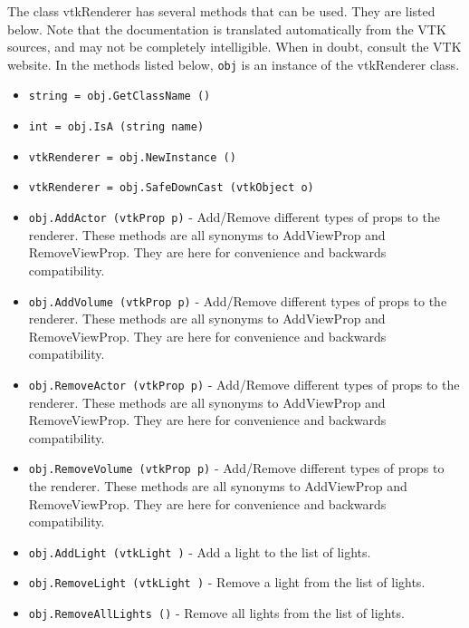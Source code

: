 The class vtkRenderer has several methods that can be used.
  They are listed below.
Note that the documentation is translated automatically from the VTK sources,
and may not be completely intelligible.  When in doubt, consult the VTK website.
In the methods listed below, \verb|obj| is an instance of the vtkRenderer class.
\begin{itemize}
\item  \verb|string = obj.GetClassName ()|

\item  \verb|int = obj.IsA (string name)|

\item  \verb|vtkRenderer = obj.NewInstance ()|

\item  \verb|vtkRenderer = obj.SafeDownCast (vtkObject o)|

\item  \verb|obj.AddActor (vtkProp p)| -  Add/Remove different types of props to the renderer.
 These methods are all synonyms to AddViewProp and RemoveViewProp.
 They are here for convenience and backwards compatibility.

\item  \verb|obj.AddVolume (vtkProp p)| -  Add/Remove different types of props to the renderer.
 These methods are all synonyms to AddViewProp and RemoveViewProp.
 They are here for convenience and backwards compatibility.

\item  \verb|obj.RemoveActor (vtkProp p)| -  Add/Remove different types of props to the renderer.
 These methods are all synonyms to AddViewProp and RemoveViewProp.
 They are here for convenience and backwards compatibility.

\item  \verb|obj.RemoveVolume (vtkProp p)| -  Add/Remove different types of props to the renderer.
 These methods are all synonyms to AddViewProp and RemoveViewProp.
 They are here for convenience and backwards compatibility.

\item  \verb|obj.AddLight (vtkLight )| -  Add a light to the list of lights.

\item  \verb|obj.RemoveLight (vtkLight )| -  Remove a light from the list of lights.

\item  \verb|obj.RemoveAllLights ()| -  Remove all lights from the list of lights.


\end{itemize}
